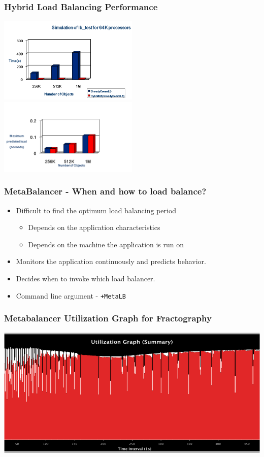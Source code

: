 \begin{frame}[fragile]
\frametitle{Hybrid Load Balancing Performance}
\includegraphics[width=0.5\textwidth]{figures/hybridLBPerf}
\includegraphics[width=0.5\textwidth]{figures/hybridLBquality}
\end{frame}

\begin{frame}[fragile]
\frametitle{MetaBalancer - When and how to load balance?}
\begin{itemize}    
    \item Difficult to find the optimum load balancing period
    \begin{itemize}
       \item Depends on the application characteristics
       \item Depends on the machine the application is run on
    \end{itemize}
    
    \item Monitors the application continuously and predicts behavior.
    \item Decides when to invoke which load balancer.
    \item Command line argument - \texttt{+MetaLB}
\end{itemize}
\end{frame}

\begin{frame}[fragile]
\frametitle{Metabalancer Utilization Graph for Fractography}
\includegraphics[width=\textwidth]{figures/meta-util}
\end{frame}
